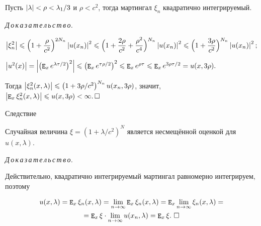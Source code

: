 \begin{lemma}{}

        Пусть $\left|{\lambda}\right|<\rho<\lambda_1/3$ и $\rho<c^2${\rm ,} тогда мартингал $\xi_n$ квадратично интегрируемый{\rm .}

    \end{lemma}



\smallskip

{\it Д\,о\,к\,а\,з\,а\,т\,е\,л\,ь\,с\,т\,в\,о.}

        \[

            \abs{\xi_n^2}\leqslant\Bigl(1+\frac{\rho}{c^2}\Bigr)^{2N_n}\abs{u(x_n)}^2\leqslant

            \Bigl(1+\frac{2\rho}{c^2}+\frac{\rho^2}{c^4}\Bigr)^{N_n}\abs{u(x_n)}^2\leqslant

            \Bigl(1+\frac{3\rho}{c^2}\Bigr)^{N_n}\abs{u(x_n)}^2;

        \]

$

            \abs{u^2(x)}=\abs{\left(\expect_xe^{\lambda\tau/2}\right)^2}\leqslant

            \left(\expect_xe^{\tau\rho/2}\right)^2\leqslant \expect_xe^{\rho\tau}\leqslant

            \expect_x e^{3\rho\tau/2}=u(x, 3\rho).

$

        Тогда $\left|{\xi_n^2(x, \lambda)}\right|\leqslant \left(1+3\rho/c^2\right)^{N_n}u(x_n, 3\rho)$, значит, \mbox{$\left|{\mathop{\tt E}\nolimits_x\xi_n^2(x, \lambda)}\right|\leqslant u(x, 3\rho)<\infty.\,\square$}





\begin{newthm}{Следствие}

        Случайная величина $\xi=\left(1+\lambda/c^2\right)^N$ является несмещённой оценкой для $u(x, \lambda)$.

\end{newthm}



{\it Д\,о\,к\,а\,з\,а\,т\,е\,л\,ь\,с\,т\,в\,о.}

        Действительно, квадратично интегрируемый мартингал равномерно интегрируем, поэтому

\begin{multline*}

u(x,\lambda)=\expect_x\xi_n(x, \lambda)=\llim_{n\to\infty}\expect_x\xi_n(x, \lambda)=\expect_x\llim_{n\to\infty}\xi_n(x, \lambda)=

\\

=\expect_x\xi\cdot\llim_{n\to\infty}u(x_n, \lambda)=\expect_x\xi.~\square

\end{multline*}





